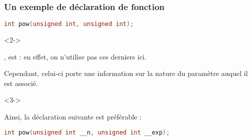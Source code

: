 \documentclass{cppcourses}
\begin{document}
\begin{frame}[fragile]

\frametitle{Un exemple de déclaration de fonction}

\begin{example}

\begin{lstlisting}[language = c++]
int pow(unsigned int, unsigned int);
\end{lstlisting}

\begin{uncoverenv}<2->

,  est  : en effet, on n'utilise pas ces derniers ici.

Cependant, celui-ci porte une information sur la nature du paramètre auquel il est associé.

\end{uncoverenv}

\begin{uncoverenv}<3->

Ainsi, la déclaration suivante est préférable :

\begin{lstlisting}[language = c++]
int pow(unsigned int __n, unsigned int __exp);
\end{lstlisting}

\end{uncoverenv}

\end{example}

\end{frame}
\end{document}
